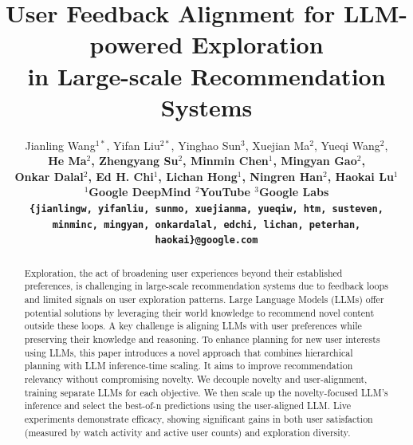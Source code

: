 \documentclass[11pt]{article}
\title{User Feedback Alignment for LLM-powered Exploration \\in Large-scale Recommendation Systems }
\author{
  Jianling Wang$^{1*}$, Yifan Liu$^{2*}$, Yinghao Sun$^3$, Xuejian Ma$^2$, Yueqi Wang$^2$, \\%
  \bf{He Ma$^2$, Zhengyang Su$^2$, Minmin Chen$^1$, Mingyan Gao$^2$,}\\ \bf{Onkar Dalal$^2$, Ed H. Chi$^1$, Lichan Hong$^1$,  Ningren Han$^2$, Haokai Lu$^1$} \\ %
  $^1$Google DeepMind \quad $^2$YouTube \quad $^3$Google Labs\\ %
  \texttt{\{jianlingw, yifanliu, sunmo, xuejianma, yueqiw, htm, susteven,} \\ %
  \texttt{minminc, mingyan, onkardalal, edchi, lichan, peterhan, haokai\}@google.com} %
}
\begin{document}
\maketitle
\def\thefootnote{*}
\begin{abstract}



Exploration, the act of broadening user experiences beyond their established preferences, is challenging in large-scale recommendation systems due to feedback loops and limited signals on user exploration patterns. Large Language Models (LLMs) offer potential solutions by leveraging their world knowledge to recommend novel content outside these loops. A key challenge is aligning LLMs with user preferences while preserving their knowledge and reasoning. To enhance planning for new user interests using LLMs, this paper introduces a novel approach that combines hierarchical planning with LLM inference-time scaling. It aims to improve recommendation relevancy without compromising novelty. We decouple novelty and user-alignment, training separate LLMs for each objective. We then scale up the novelty-focused LLM's inference and select the best-of-n predictions using the user-aligned LLM. Live experiments demonstrate efficacy, showing significant gains in both user satisfaction (measured by watch activity and active user counts) and exploration diversity.
\end{abstract}
\end{document}
